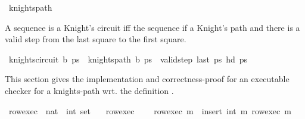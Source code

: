 \begin{isabellebody}
\isanewline
{}\isamarkupfalse%
\ knights{\isacharunderscore}{\kern0pt}path%
\isadelimproof
\ %
\endisadelimproof
%
\isatagproof
\isacommand{{\isachardot}{\kern0pt}}\isamarkupfalse%
%
\endisatagproof
{\isafoldproof}%
%
\isadelimproof
%
\endisadelimproof
%
\begin{isamarkuptext}%
A sequence is a Knight's circuit iff the sequence if a Knight's path and there is a valid 
step from the last square to the first square.%
\end{isamarkuptext}\isamarkuptrue%
\isamarkupfalse%
\ {\isachardoublequoteopen}knights{\isacharunderscore}{\kern0pt}circuit\ b\ ps\ {\isasymequiv}\ {\isacharparenleft}{\kern0pt}knights{\isacharunderscore}{\kern0pt}path\ b\ ps\ {\isasymand}\ valid{\isacharunderscore}{\kern0pt}step\ {\isacharparenleft}{\kern0pt}last\ ps{\isacharparenright}{\kern0pt}\ {\isacharparenleft}{\kern0pt}hd\ ps{\isacharparenright}{\kern0pt}{\isacharparenright}{\kern0pt}{\isachardoublequoteclose}%
\isadelimdocument
%
\endisadelimdocument
%
\isatagdocument
%
\isamarkuptrue%
%
\endisatagdocument
{\isafolddocument}%
%
\isadelimdocument
%
\endisadelimdocument
%
\begin{isamarkuptext}%
This section gives the implementation and correctness-proof for an executable checker for a
knights-path wrt. the definition .%
\end{isamarkuptext}\isamarkuptrue%
%
\isadelimdocument
%
\endisadelimdocument
%
\isatagdocument
%
\isamarkuptrue%
%
\endisatagdocument
{\isafolddocument}%
%
\isadelimdocument
%
\endisadelimdocument
{}\isamarkupfalse%
\ row{\isacharunderscore}{\kern0pt}exec\ {\isacharcolon}{\kern0pt}{\isacharcolon}{\kern0pt}\ {\isachardoublequoteopen}nat\ {\isasymRightarrow}\ int\ set{\isachardoublequoteclose}\ \isanewline
\ \ {\isachardoublequoteopen}row{\isacharunderscore}{\kern0pt}exec\ {}\ {\isacharequal}{\kern0pt}\ {\isacharbraceleft}{\kern0pt}{\isacharbraceright}{\kern0pt}{\isachardoublequoteclose}\isanewline
{\isacharbar}{\kern0pt}\ {\isachardoublequoteopen}row{\isacharunderscore}{\kern0pt}exec\ m\ {\isacharequal}{\kern0pt}\ insert\ {\isacharparenleft}{\kern0pt}int\ m{\isacharparenright}{\kern0pt}\ {\isacharparenleft}{\kern0pt}row{\isacharunderscore}{\kern0pt}exec\ {\isacharparenleft}{\kern0pt}m{\isacharminus}{\kern0pt}{}{\isacharparenright}{\kern0pt}{\isacharparenright}{\kern0pt}{\isachardoublequoteclose}\isanewline

\end{isabellebody}

